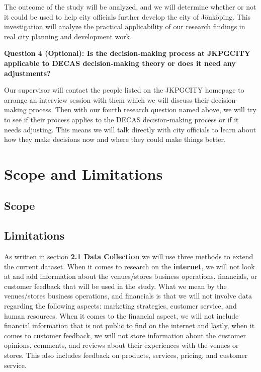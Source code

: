 The outcome of the study will be analyzed, and we will determine whether or not it could be used to help city officials further develop the city of Jönköping. This investigation will analyze the practical applicability of our research findings in real city planning and development work.



\textbf{Question 4 (Optional): Is the decision-making process at JKPGCITY applicable to DECAS decision-making theory or does it need any adjustments?  }


Our supervisor will contact the people listed on the JKPGCITY homepage to arrange an interview session with them which we will discuss their decision-making process. Then with our fourth research question named above, we will try to see if their process applies to the DECAS decision-making process or if it needs adjusting. This means we will talk directly with city officials to learn about how they make decisions now and where they could make things better.




\section{Scope and Limitations}

\subsection{Scope}

\subsection{Limitations}
As written in section \textbf{2.1 Data Collection} we will use three methods to extend the current dataset. When it comes to research on the \textbf{ internet}, we will not look at and add information about the venues/stores business operations, financials, or customer feedback that will be used in the study. What we mean by the venues/stores business operations, and financials is that we will not involve data regarding the following aspects: marketing strategies, customer service, and human resources. When it comes to the financial aspect, we will not include financial information that is not public to find on the internet and lastly, when it comes to customer feedback, we will not store information about the customer opinions, comments, and reviews about their experiences with the venues or stores. This also includes feedback on products, services, pricing, and customer service.


